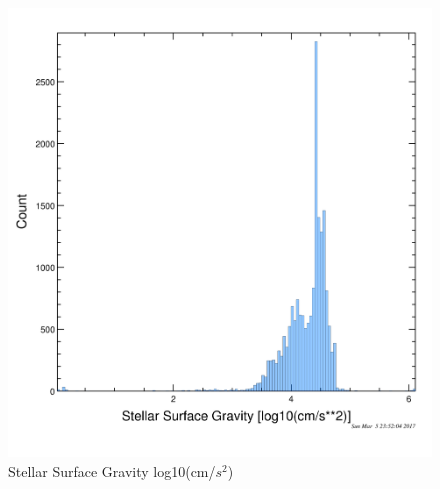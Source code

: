 \begin{figure}[!h]
\begin{center}
        \includegraphics[width=0.5\textheight]{img/stellargravity.png}
        \caption{ Stellar Surface Gravity log10(cm/$s^{2}$)}  \label{plot:stellargravity}
\end{center}
\end{figure}


